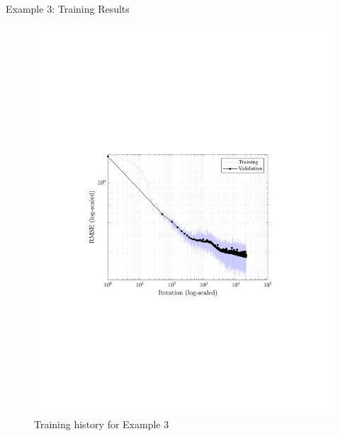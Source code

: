 \documentclass[9pt]{beamer}
\newcounter{frame}[frame]
\begin{document}
\begin{frame}{Example 3: Training Results}
\begin{figure}
	\includegraphics[height=.8\textheight]{neuralNetHysteresis03RMSE}
	\caption{Training history for Example 3}
\end{figure}
\end{frame}
\end{document}
